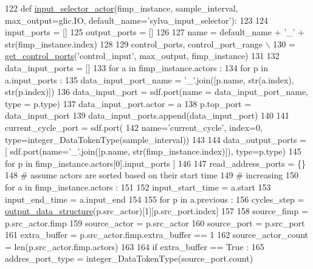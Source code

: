 \begin{DoxyCode}
122 \textcolor{keyword}{def }\hyperlink{namespacesylva_1_1code__generation_1_1air_aaa165d9fb26a2af721734a446b1549fa}{input\_selector\_actor}(fimp\_instance, sample\_interval, max\_output=glic.IO, 
      default\_name='sylva\_input\_selector'):
123 
124   input\_ports = []
125   output\_ports = []
126 
127   name = default\_name + \textcolor{stringliteral}{'\_'} + str(fimp\_instance.index)
128 
129   control\_ports, control\_port\_range \(\backslash\)
130   = \hyperlink{namespacesylva_1_1code__generation_1_1air_a71d379169f113b29c326aa9f70c6d47e}{get\_control\_ports}(\textcolor{stringliteral}{'control\_input'}, max\_output, fimp\_instance)
131 
132   data\_input\_ports = []
133   \textcolor{keywordflow}{for} a \textcolor{keywordflow}{in} fimp\_instance.actors :
134     \textcolor{keywordflow}{for} p \textcolor{keywordflow}{in} a.input\_ports :
135       data\_input\_port\_name = \textcolor{stringliteral}{'\_'}.join([p.name, str(a.index), str(p.index)])
136       data\_input\_port = sdf.port(name = data\_input\_port\_name, type = p.type)
137       data\_input\_port.actor = a
138       p.top\_port = data\_input\_port
139       data\_input\_ports.append(data\_input\_port)
140 
141   current\_cycle\_port = sdf.port(
142     name=\textcolor{stringliteral}{'current\_cycle'}, index=0, type=integer\_DataTokenType(sample\_interval))
143 
144   data\_output\_ports = [ sdf.port(name=\textcolor{stringliteral}{'\_'}.join([p.name, str(fimp\_instance.index)]), type=p.type)
145                    \textcolor{keywordflow}{for} p \textcolor{keywordflow}{in} fimp\_instance.actors[0].input\_ports ]
146 
147   read\_address\_ports = \{\}
148   \textcolor{comment}{# assume actors are sorted based on their start time}
149   \textcolor{comment}{# increasing}
150   \textcolor{keywordflow}{for} a \textcolor{keywordflow}{in} fimp\_instance.actors :
151 
152     input\_start\_time = a.start
153     input\_end\_time = a.input\_end
154 
155     \textcolor{keywordflow}{for} p \textcolor{keywordflow}{in} a.previous :
156       cycles\_step = \hyperlink{namespacesylva_1_1code__generation_1_1air_a83186b3b999778cee36ac81d42b2cd44}{output\_data\_structure}(p.src\_actor)[1][p.src\_port.index]
157 
158       source\_fimp = p.src\_actor.fimp
159       source\_actor = p.src\_actor
160       source\_port = p.src\_port
161       extra\_buffer = p.src\_actor.fimp.extra\_buffer == 1
162       source\_actor\_count = len(p.src\_actor.fimp.actors)
163 
164       \textcolor{keywordflow}{if} extra\_buffer == \textcolor{keyword}{True} :
165         addres\_port\_type = integer\_DataTokenType(source\_port.count)

\end{DoxyCode}
